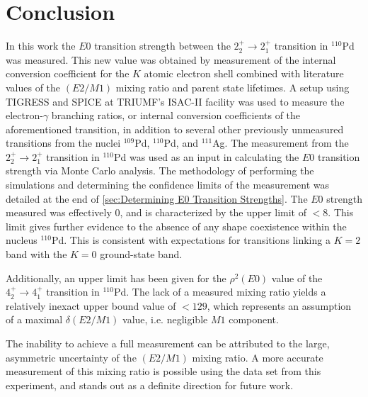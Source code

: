 



\chapter{Conclusion}
\label{ch:Conclusion}

In this work the $E0$ transition strength between the $2_2^+ \rightarrow 2_1^+$ transition in $^{110}$Pd was measured. This new value was obtained by measurement of the internal conversion coefficient for the $K$ atomic electron shell combined with literature values of the $(E2/M1)$ mixing ratio and parent state lifetimes. 
A setup using TIGRESS and SPICE at TRIUMF's ISAC-II facility was used to measure the electron-$\gamma$ branching ratios, or internal conversion coefficients of the aforementioned transition, in addition to several other previously unmeasured transitions from the nuclei $^{109}$Pd, $^{110}$Pd, and $^{111}$Ag. The measurement from the $2_2^+ \rightarrow 2_1^+$ transition in $^{110}$Pd was used as an input in calculating the $E0$ transition strength via Monte Carlo analysis. The methodology of performing the simulations and determining the confidence limits of the measurement was detailed at the end of \autoref{sec:Determining E0 Transition Strengths}. The $E0$ strength measured was effectively 0, and is characterized by the upper limit of $<8$. This limit gives further evidence to the absence of any shape coexistence within the nucleus $^{110}$Pd. This is consistent with expectations for transitions linking a $K=2$ band with the $K=0$ ground-state band.

Additionally, an upper limit has been given for the $\rho^2(E0)$ value of the $4^+_2 \rightarrow 4^+_1$ transition in $^{110}$Pd. The lack of a measured mixing ratio yields a relatively inexact upper bound value of $<129$, which represents an assumption of a maximal $\delta(E2/M1)$ value, i.e. negligible $M1$ component.

The inability to achieve a full measurement can be attributed to the large, asymmetric uncertainty of the $(E2/M1)$ mixing ratio. A more accurate measurement of this mixing ratio is possible using the data set from this experiment, and stands out as a definite direction for future work. 

\endinput

Any text after an \endinput is ignored.
You could put scraps here or things in progress.
